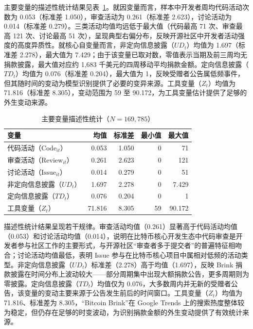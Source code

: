 \documentclass[
    type = master, %
    degree = professional,        %
    decl-page,  %
    twoside,                %
    fontset = fandol %
  ]{njuthesis}
\begin{document}
主要变量的描述性统计结果见表~\ref{tab:desc-stats}。就因变量而言，样本中开发者周均代码活动次数为 0.053（标准差 1.050），审查活动为 0.261（标准差 2.623），讨论活动为 0.014（标准差 0.279）。三类活动均值均远低于最大值（代码最高 71 次、审查最高 121 次、讨论最高 51 次），呈现典型右偏分布，反映开源社区中开发者活动强度的高度异质性。就核心自变量而言，非定向信息披露（$UD_t$）均值为 1.697（标准差 2.278），最大值为 7.429；由于该变量已取对数，零值表示当期及前三周均无捐款披露，最大值对应约 1,683 千美元的四周移动平均捐款金额。定向信息披露（$TD_t$）均值为 0.076（标准差 0.204），最大值为 1，反映受赠者公告属低频事件，但其随时间的变动为模型识别提供了必要的变异来源。工具变量（$Z_t$）均值为 71.816（标准差 8.305），变动范围为 59 至 90.172，为工具变量估计提供了足够的外生变动来源。

\begin{table}[htbp]
    \centering
    \caption{主要变量描述性统计（$N = 169{,}785$）}
    \label{tab:desc-stats}
    \begin{tabularx}{\textwidth}{Xrrrr}
        \toprule
        变量 & 均值 & 标准差 & 最小值 & 最大值 \\
        \midrule
        代码活动（$\text{Code}_{it}$）      & 0.053 & 1.050 & 0 & 71 \\
        审查活动（$\text{Review}_{it}$）    & 0.261 & 2.623 & 0 & 121 \\
        讨论活动（$\text{Issue}_{it}$）     & 0.014 & 0.279 & 0 & 51 \\
        非定向信息披露（$UD_t$） & 1.697 & 2.278 & 0 & 7.429 \\
        定向信息披露（$TD_t$） & 0.076 & 0.204 & 0 & 1 \\
        工具变量（$Z_t$） & 71.816 & 8.305 & 59 & 90.172 \\
        \bottomrule
    \end{tabularx}
\end{table}

描述性统计结果呈现若干规律。审查活动均值（0.261）显著高于代码活动均值（0.053）和讨论活动均值（0.014），说明在比特币核心开发生态中代码审查是开发者参与社区工作的主要形式，与开源社区“审查者多于提交者”的普遍特征相吻合；讨论活动均值最低，表明 Issue 参与在比特币核心项目中属相对低频的活动类型。非定向信息披露（$UD_t$）标准差（2.278）高于均值（1.697），反映 Brink 捐款披露在时间分布上波动较大——部分周期集中出现大额捐款公告，更多周期则为零披露。定向信息披露（$TD_t$）均值仅为 0.076，大多数周内并无新的受赠者公告，该变量的变动主要来源于公告发生前后的时间窗口。工具变量（$Z_t$）均值为 71.816、标准差为 8.305，“Bitcoin Brink”在 Google Trends 上的搜索热度整体较为稳定，但仍存在足够的时变波动，为识别捐款金额的外生变动提供了有效统计来源。
\end{document}
